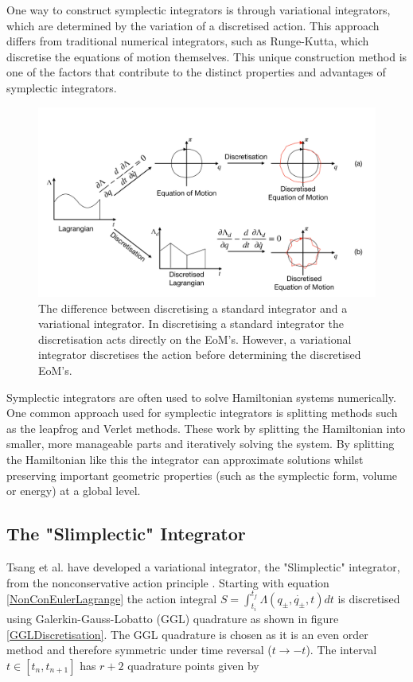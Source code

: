 \documentclass[10pt]{iopart}
\begin{document}
One way to construct symplectic integrators is through variational integrators, which are determined by the variation of a discretised action. This approach differs from traditional numerical integrators, such as Runge-Kutta, which discretise the equations of motion themselves. This unique construction method is one of the factors that contribute to the distinct properties and advantages of symplectic integrators.


\begin{figure}
	\label{VariationalIntegrator}
	\centering
	\includegraphics[width=\columnwidth]{Variational.pdf}
	\caption{The difference between discretising a standard integrator and a variational integrator. In discretising a standard integrator the discretisation acts directly on the EoM's. However, a variational integrator discretises the action before determining the discretised EoM's.}
\end{figure}

Symplectic integrators are often used to solve Hamiltonian systems numerically. One common approach used for symplectic integrators is splitting methods such as the leapfrog and Verlet \cite{Verlet} methods. These work by splitting the Hamiltonian into smaller, more manageable parts and iteratively solving the system. By splitting the Hamiltonian like this the integrator can approximate solutions whilst preserving important geometric properties (such as the symplectic form, volume or energy) at a global level.

\subsection{The "Slimplectic" Integrator \\}
Tsang et al. \cite{Tsang_Slimplectic} have developed a variational integrator, the "Slimplectic" integrator, from the nonconservative action principle \cite{GalleyEtAl}. Starting with equation \ref{NonConEulerLagrange} the action integral $S = \int_{t_i}^{t_f}\Lambda(q_{\pm},\dot{q_{\pm}},t)dt$ is discretised using Galerkin-Gauss-Lobatto (GGL) quadrature \cite{GGL} as shown in figure \ref{GGLDiscretisation}. The GGL quadrature is chosen as it is an even order method and therefore symmetric under time reversal ($t\to-t$). The interval $t\in [t_n, t_{n+1}]$ has $r+2$ quadrature points given by
\end{document}
